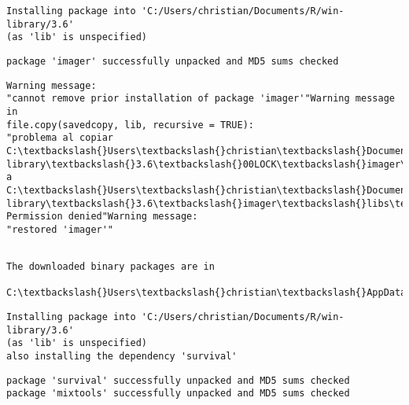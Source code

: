 \documentclass[11pt]{article}
\begin{document}
    \begin{Verbatim}[commandchars=\\\{\}]
Installing package into 'C:/Users/christian/Documents/R/win-library/3.6'
(as 'lib' is unspecified)
    \end{Verbatim}

    \begin{Verbatim}[commandchars=\\\{\}]
package 'imager' successfully unpacked and MD5 sums checked
    \end{Verbatim}

    \begin{Verbatim}[commandchars=\\\{\}]
Warning message:
"cannot remove prior installation of package 'imager'"Warning message in
file.copy(savedcopy, lib, recursive = TRUE):
"problema al copiar C:\textbackslash{}Users\textbackslash{}christian\textbackslash{}Documents\textbackslash{}R\textbackslash{}win-
library\textbackslash{}3.6\textbackslash{}00LOCK\textbackslash{}imager\textbackslash{}libs\textbackslash{}x64\textbackslash{}imager.dll  a
C:\textbackslash{}Users\textbackslash{}christian\textbackslash{}Documents\textbackslash{}R\textbackslash{}win-library\textbackslash{}3.6\textbackslash{}imager\textbackslash{}libs\textbackslash{}x64\textbackslash{}imager.dll:
Permission denied"Warning message:
"restored 'imager'"
    \end{Verbatim}

    \begin{Verbatim}[commandchars=\\\{\}]

The downloaded binary packages are in
        C:\textbackslash{}Users\textbackslash{}christian\textbackslash{}AppData\textbackslash{}Local\textbackslash{}Temp\textbackslash{}RtmpaY1B5e\textbackslash{}downloaded\_packages
    \end{Verbatim}

    \begin{Verbatim}[commandchars=\\\{\}]
Installing package into 'C:/Users/christian/Documents/R/win-library/3.6'
(as 'lib' is unspecified)
also installing the dependency 'survival'

    \end{Verbatim}

    \begin{Verbatim}[commandchars=\\\{\}]
package 'survival' successfully unpacked and MD5 sums checked
package 'mixtools' successfully unpacked and MD5 sums checked
    \end{Verbatim}
\end{document}
